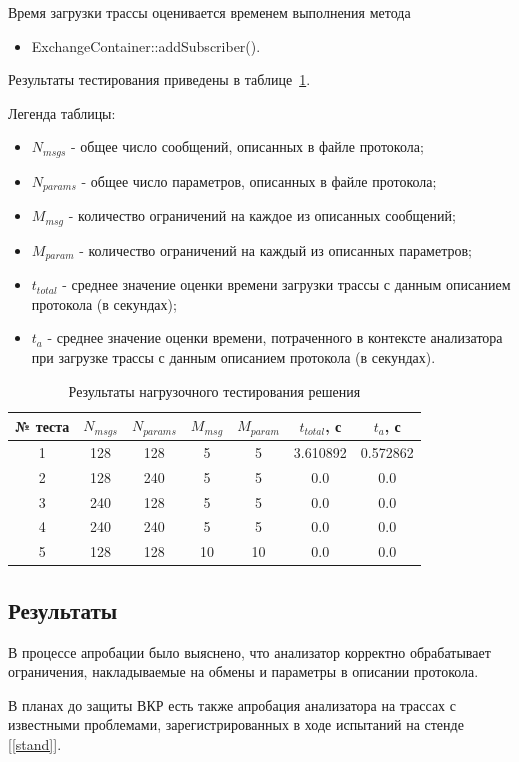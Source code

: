 Время загрузки трассы оценивается временем выполнения метода 

\begin{itemize}
 \item ExchangeContainer::addSubscriber().
\end{itemize}

Результаты тестирования приведены в таблице~\ref{tab:prof}.

Легенда таблицы:

\begin{itemize}
 \item $N_{msgs}$ - общее число сообщений, описанных в файле протокола;
 \item $N_{params}$ - общее число параметров, описанных в файле протокола;
 \item $M_{msg}$ - количество ограничений на каждое из описанных сообщений;
 \item $M_{param}$ - количество ограничений на каждый из описанных параметров;
 \item $t_{total}$ - среднее значение оценки времени загрузки трассы с данным 
описанием протокола (в секундах);
 \item $t_{a}$ - среднее значение оценки времени, потраченного в контексте 
анализатора при загрузке трассы с данным описанием протокола (в секундах).
\end{itemize}


\begin{table}[H]
 \centering
 \begin{tabular}{|c|*{6}{c|}}
  \hline
  № теста & $N_{msgs}$ & $N_{params}$ & $M_{msg}$ & $M_{param}$ & $t_{total}$, 
с & $t_{a}$, с \\
  \hline
  1 & 128 & 128 & 5 & 5 & 3.610892 & 0.572862 \\
  2 & 128 & 240 & 5 & 5 & 0.0 & 0.0 \\
  3 & 240 & 128 & 5 & 5 & 0.0 & 0.0 \\
  4 & 240 & 240 & 5 & 5 & 0.0 & 0.0 \\
  5 & 128 & 128 & 10 & 10 & 0.0 & 0.0 \\
  \hline
 \end{tabular}
 \caption{Результаты нагрузочного тестирования решения}
 \label{tab:prof}
\end{table}


\subsection{Результаты}

В процессе апробации было выяснено, что анализатор корректно обрабатывает 
ограничения, накладываемые на обмены и параметры в описании протокола.

В планах до защиты ВКР есть также апробация анализатора на трассах с 
известными проблемами, зарегистрированных в ходе испытаний на стенде 
[\ref{stand}].